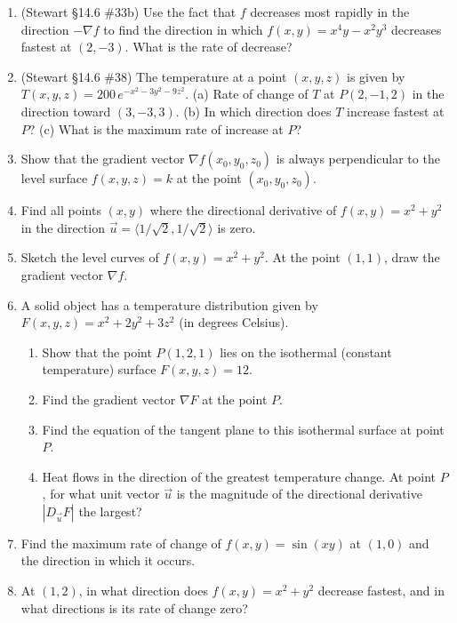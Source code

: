 \documentclass[12pt]{article}
\begin{document}
\begin{enumerate}
\begin{enumerate}
        \item (Stewart \S14.6 \#33b) Use the fact that $f$ decreases most rapidly in the direction $-\nabla f$ to find the direction in which $f(x,y) = x^4 y - x^2 y^3$ decreases fastest at $(2,-3)$. What is the rate of decrease?
        \item (Stewart \S14.6 \#38) The temperature at a point $(x,y,z)$ is given by $T(x,y,z) = 200\,e^{-x^2 - 3y^2 - 9z^2}$.
        (a) Rate of change of $T$ at $P(2,-1,2)$ in the direction toward $(3,-3,3)$.
        (b) In which direction does $T$ increase fastest at $P$?
        (c) What is the maximum rate of increase at $P$?
        \item Show that the gradient vector $\nabla f(x_0, y_0, z_0)$ is always perpendicular to the level surface $f(x,y,z) = k$ at the point $(x_0, y_0, z_0)$.
        \item Find all points $(x,y)$ where the directional derivative of $f(x,y) = x^2 + y^2$ in the direction $\vec{u} = \langle 1/\sqrt{2}, 1/\sqrt{2} \rangle$ is zero.
        \item Sketch the level curves of $f(x,y) = x^2 + y^2$. At the point $(1,1)$, draw the gradient vector $\nabla f$.
        \item A solid object has a temperature distribution given by $F(x, y, z) = x^2 + 2y^2 + 3z^2$ (in degrees Celsius).
        \begin{enumerate}
            \item Show that the point $P(1, 2, 1)$ lies on the isothermal (constant temperature) surface $F(x, y, z) = 12$.
            \item Find the gradient vector $\nabla F$ at the point $P$.
            \item Find the equation of the tangent plane to this isothermal surface at point $P$.
            \item Heat flows in the direction of the greatest temperature change. At point $P$, for what unit vector $\vec u$ is the magnitude of the directional derivative $|D_{\vec u} F|$ the largest?
        \end{enumerate}
        \item Find the maximum rate of change of $f(x,y)=\sin(xy)$ at $(1,0)$ and the direction in which it occurs.
        \item At $(1,2)$, in what direction does $f(x,y)=x^2+y^2$ decrease fastest, and in what directions is its rate of change zero?
    \end{enumerate}
\newpage


\end{enumerate}
\end{document}

